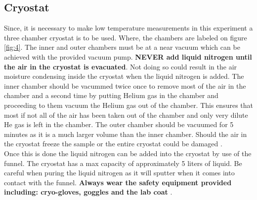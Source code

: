 \documentclass[twocolumn]{article}
\begin{document}
\subsection{Cryostat}
Since, it is necessary to make low temperature measurements in this experiment 
a three chamber cryostat is to be used. Where, the chambers are labeled on 
figure \ref{fig:4}. The inner and outer chambers must be at a near vacuum 
which can be 
achieved with the provided vacuum pump. \textbf{NEVER add liquid nitrogen until 
the air in the cryostat is evacuated}. Not doing so could result in the air 
moisture condensing inside the cryostat when the liquid nitrogen is added. The 
inner chamber should be vacummed twice once to remove most of the air in the 
chamber and a second time by putting Helium gas in the chamber and proceeding 
to them vacuum the Helium gas out of the chamber. This ensures that most if 
not all of the air has been taken out of the chamber and only very dilute He 
gas is left in the chamber. The outer chamber should be vacuumed for 5 minutes 
as it is a much larger volume than the inner chamber. Should the air in the 
cryostat freeze the sample or the entire cryostat could be damaged \cite{ref:3}.
\\
Once this is done the liquid nitrogen can be added into the cryostat by use of 
the funnel. The cryostat has a max capacity of approximately 5 liters of 
liquid. Be careful when puring the liquid nitrogen as it will sputter when it 
comes into contact with the funnel. \textbf{Always wear the safety equipment 
provided including: cryo-gloves, goggles and the lab coat} \cite{ref:3}.
\end{document}
